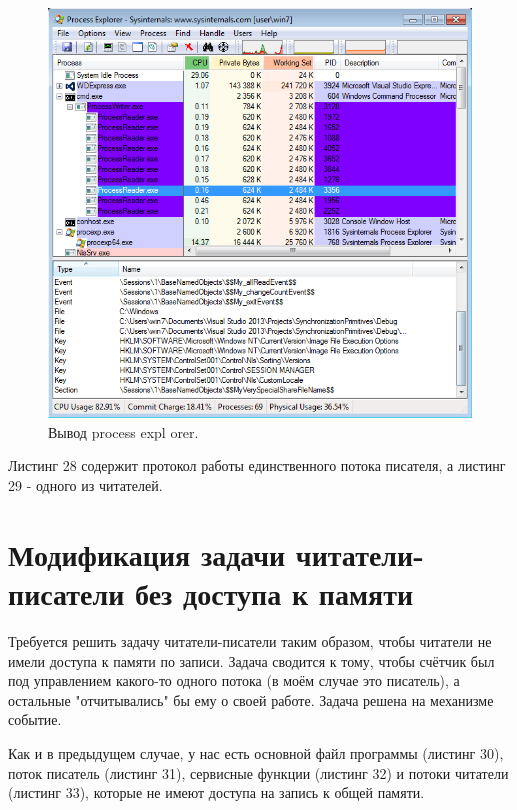 \documentclass[a4paper, 12pt]{article}		%
\begin{document}
\begin{figure}[h!]
\centering
\includegraphics[scale=0.45]{res/pe_07}
\caption{Вывод process expl
orer.}
\end{figure}
\newpage

Листинг 28 содержит протокол работы единственного потока писателя, а листинг 29 - одного из читателей.





\newpage
\section{Модификация задачи читатели-писатели без доступа к памяти}

Требуется решить задачу читатели-писатели таким образом, чтобы читатели не имели доступа к памяти по записи. Задача сводится к тому, чтобы счётчик был под управлением какого-то одного потока (в моём случае это писатель), а остальные "отчитывались" бы ему о своей работе. Задача решена на механизме событие\cite{Dushutina}.

Как и в предыдущем случае, у нас есть основной файл программы (листинг 30), поток писатель (листинг 31), сервисные функции (листинг 32) и потоки читатели (листинг 33), которые не имеют доступа на запись к общей памяти.
\end{document}
